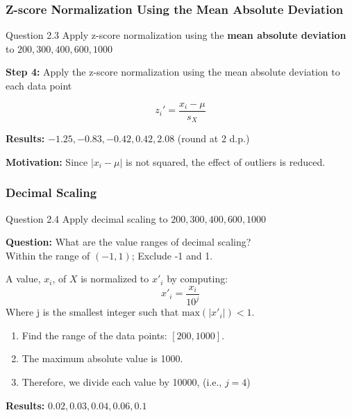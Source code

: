 \documentclass[aspectratio=169, 10pt]{beamer}
\begin{document}

\begin{frame}[t]
    \frametitle{Z-score Normalization Using the Mean Absolute Deviation}
    \small

    \begin{block}{Question 2.3}
        Apply z-score normalization using the \textbf{mean absolute deviation} to $200, 300, 400, 600, 1000$
    \end{block}

    \textbf{Step 4:} Apply the z-score normalization using the mean absolute deviation to each data point
    
    \[z_i' = \frac{x_i - \mu}{s_X}\]
    
    \textbf{Results:} $-1.25, -0.83, -0.42,  0.42,  2.08$ (round at 2 d.p.)\\

    \vspace{1em}

    \textbf{Motivation:} Since $|x_i - \mu|$ is not squared, the effect of outliers is reduced.
\end{frame}


\begin{frame}[t]
    \frametitle{Decimal Scaling}
    \small

    \begin{block}{Question 2.4}
        Apply decimal scaling to $200, 300, 400, 600, 1000$
    \end{block}

    \textbf{Question:} What are the value ranges of decimal scaling?\\
    Within the range of $(-1, 1)$; Exclude -1 and 1.
    \vspace{1em}

    A value, $x_i$, of $X$ is normalized to $x'_i$ by computing:
    \[
        x'_i = \frac{x_i}{10^j}
    \]
    Where j is the smallest integer such that $\text{max}(|x'_i|)<1$.
    \vspace{1em}

    \begin{enumerate}
        \item Find the range of the data points: $[200, 1000]$.
        \item The maximum absolute value is 1000.
        \item Therefore, we divide each value by 10000, (i.e., $j = 4$)
    \end{enumerate}
    
    \textbf{Results:} $0.02, 0.03, 0.04, 0.06, 0.1$
    
\end{frame}
\end{document}
